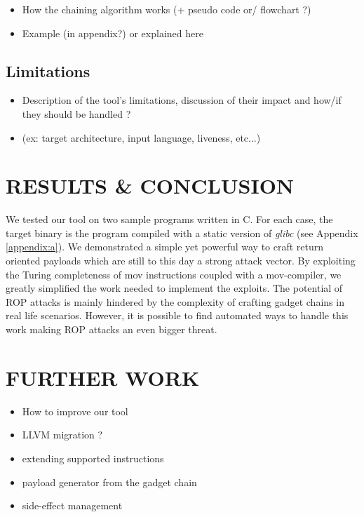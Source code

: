 \documentclass[10pt,twocolumn]{article}
\begin{document}
\begin{itemize}
    \item How the chaining algorithm works (+ pseudo code or/ flowchart ?)
    \item Example (in appendix?) or explained here
\end{itemize}
\subsection{Limitations}
\begin{itemize}
    \item Description of the tool's limitations, discussion of their impact and
        how/if they should be handled ?
    \item (ex: target architecture, input language, liveness, etc...)
\end{itemize}



  
\section{RESULTS \& CONCLUSION}
  We tested our tool on two sample programs written in C. For each case, the
  target binary is the program compiled with a static version of \textit{glibc}
  (see Appendix \ref{appendix:a}).
  We demonstrated a simple yet powerful way to craft return oriented payloads
  which are still to this day a strong attack vector. By exploiting the Turing
  completeness of mov instructions coupled with a mov-compiler, we greatly
  simplified the work needed to implement the exploits. The potential of ROP
  attacks is mainly hindered by the complexity of crafting gadget chains in real
  life scenarios. However, it is possible to find automated ways to handle this
  work making ROP attacks an even bigger threat.

\section{FURTHER WORK}
\begin{itemize}
    \item How to improve our tool
    \item LLVM migration ?
    \item extending supported instructions
    \item payload generator from the gadget chain
    \item side-effect management
\end{itemize}
\end{document}
